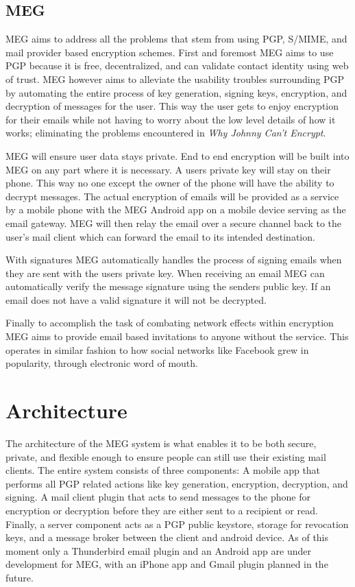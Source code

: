 \documentclass[10pt]{article}
\begin{document}
\begin{multicols}{2}
\subsection{MEG}
\par MEG aims to address all the problems that stem from using PGP, S/MIME, and mail provider based encryption schemes. First and foremost MEG aims to use PGP because it is free, decentralized, and can validate contact identity using web of trust. MEG however aims to alleviate the usability troubles surrounding PGP by automating the entire process of key generation, signing keys, encryption, and decryption of messages for the user. This way the user gets to enjoy encryption for their emails while not having to worry about the low level details of how it works; eliminating the problems encountered in \textit{Why Johnny Can't Encrypt}\cite{whitten1999johnny}.
\par MEG will ensure user data stays private. End to end encryption will be built into MEG on any part where it is necessary. A users private key will stay on their phone. This way no one except the owner of the phone will have the ability to decrypt messages. The actual encryption of emails will be provided as a service by a mobile phone with the MEG Android app on a mobile device serving as the email gateway. MEG will then relay the email over a secure channel back to the user's mail client which can forward the email to its intended destination.
\par With signatures MEG automatically handles the process of signing emails when they are sent with the users private key. When receiving an email MEG can automatically verify the message signature using the senders public key. If an email does not have a valid signature it will not be decrypted.
\par Finally to accomplish the task of combating network effects within encryption MEG aims to provide email based invitations to anyone without the service. This operates in similar fashion to how social networks like Facebook grew in popularity, through electronic word of mouth\cite{trusov2009effects}.

\section{Architecture}
\par The architecture of the MEG system is what enables it to be both secure, private, and flexible enough to ensure people can still use their existing mail clients. The entire system consists of three components: A mobile app that performs all PGP related actions like key generation, encryption, decryption, and signing. A mail client plugin that acts to send messages to the phone for encryption or decryption before they are either sent to a recipient or read. Finally, a server component acts as a PGP public keystore, storage for revocation keys, and a message broker between the client and android device. As of this moment only a Thunderbird email plugin and an Android app are under development for MEG, with an iPhone app and Gmail plugin planned in the future.
\end{multicols}
\end{document}
